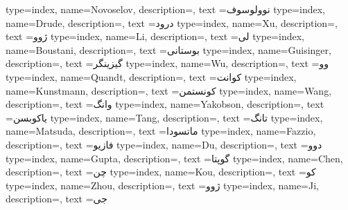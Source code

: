 {
    type=index,
    name={Novoselov},
    description={},
    text ={نوولوسوف}
}
{
    type=index,
    name={Drude},
    description={},
    text ={درود}
}
{
    type=index,
    name={Xu},
    description={},
    text ={ژوو}
}
{
    type=index,
    name={Li},
    description={},
    text ={لی}
}
{
    type=index,
    name={Boustani},
    description={},
    text ={بوستانی}
}
{
    type=index,
    name={Guisinger},
    description={},
    text ={گیزینگر}
}
{
    type=index,
    name={Wu},
    description={},
    text ={وو}
}
{
    type=index,
    name={Quandt},
    description={},
    text ={کوانت}
}
{
    type=index,
    name={Kunstmann},
    description={},
    text ={کونستمن}
}
{
    type=index,
    name={Wang},
    description={},
    text ={وانگ}
}
{
    type=index,
    name={Yakobson},
    description={},
    text ={یاکوبسن}
}
{
    type=index,
    name={Tang},
    description={},
    text ={تانگ}
}
{
    type=index,
    name={Matsuda},
    description={},
    text ={ماتسودا}
}
{
    type=index,
    name={Fazzio},
    description={},
    text ={فازیو}
}
{
    type=index,
    name={Du},
    description={},
    text ={دوو}
}
{
    type=index,
    name={Gupta},
    description={},
    text ={گوپتا}
}
{
    type=index,
    name={Chen},
    description={},
    text ={چن}
}
{
    type=index,
    name={Kou},
    description={},
    text ={کو}
}
{
    type=index,
    name={Zhou},
    description={},
    text ={ژوو}
}
{
    type=index,
    name={Ji},
    description={},
    text ={جی}
}